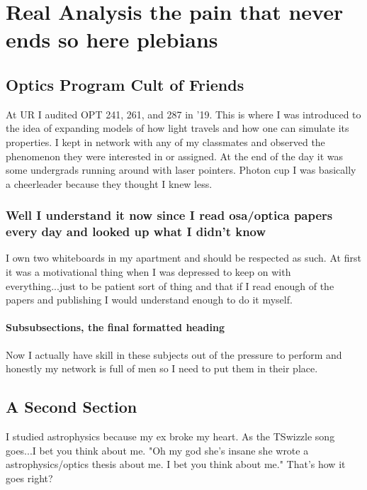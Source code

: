\chapter{Real Analysis the pain that never ends so here plebians}



\section[Shorter Title]{Optics Program Cult of Friends}

At UR I audited OPT 241, 261, and 287 in '19. This is where I was introduced to the idea of expanding models of how light travels and how one can simulate its properties. I kept in network with any of my classmates and observed the phenomenon they were interested in or assigned. At the end of the day it was some undergrads running around with laser pointers. Photon cup I was basically a cheerleader because they thought I knew less.  

\subsection{Well I understand it now since I read osa/optica papers every day and looked up what I didn't know}

I own two whiteboards in my apartment and should be respected as such. At first it was a motivational thing when I was depressed to keep on with everything...just to be patient sort of thing and that if I read enough of the papers and publishing I would understand enough to do it myself. 

\subsubsection{Subsubsections, the final formatted heading}

Now I actually have skill in these subjects out of the pressure to perform and honestly my network is full of men so I need to put them in their place. 

\section{A Second Section}

I studied astrophysics because my ex broke my heart. As the TSwizzle song goes...I bet you think about me. "Oh my god she's insane she wrote a astrophysics/optics thesis about me. I bet you think about me." That's how it goes right?